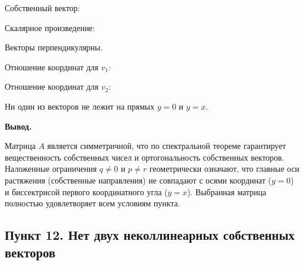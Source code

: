 \documentclass[a4paper,14pt]{extarticle}
\begin{document}
Собственный вектор:
\begin{center}\end{center}

Скалярное произведение:
\begin{center}\end{center}

Векторы перпендикулярны.

Отношение координат для \(v_1\):
\begin{center}\end{center}

Отношение координат для \(v_2\):
\begin{center}\end{center}

Ни один из векторов не лежит на прямых \(y = 0\) и \(y = x\).

\textbf{Вывод.}

Матрица \(A\) является симметричной, что по спектральной теореме
гарантирует вещественность собственных чисел и ортогональность
собственных векторов. Наложенные ограничения \(q \neq 0\) и \(p \neq r\)
геометрически означают, что главные оси растяжения (собственные
направления) не совпадают с осями координат (\(y=0\)) и биссектрисой
первого координатного угла (\(y=x\)). Выбранная матрица полностью
удовлетворяет всем условиям пункта.

\hypertarget{ux43fux443ux43dux43aux442-12.-ux43dux435ux442-ux434ux432ux443ux445-ux43dux435ux43aux43eux43bux43bux438ux43dux435ux430ux440ux43dux44bux445-ux441ux43eux431ux441ux442ux432ux435ux43dux43dux44bux445-ux432ux435ux43aux442ux43eux440ux43eux432}{%
\subsection{Пункт 12. Нет двух неколлинеарных собственных
векторов}\label{ux43fux443ux43dux43aux442-12.-ux43dux435ux442-ux434ux432ux443ux445-ux43dux435ux43aux43eux43bux43bux438ux43dux435ux430ux440ux43dux44bux445-ux441ux43eux431ux441ux442ux432ux435ux43dux43dux44bux445-ux432ux435ux43aux442ux43eux440ux43eux432}}
\end{document}
